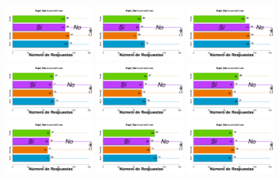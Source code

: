 \begin{figure}[th]
\includegraphics[width=0.30\textwidth]{Figures/BiasColor_Exp2_P10} \includegraphics[width=0.30\textwidth]{Figures/BiasColor_Exp2_P11} \includegraphics[width=0.30\textwidth]{Figures/BiasColor_Exp2_P12}
\includegraphics[width=0.30\textwidth]{Figures/BiasColor_Exp2_P13} \includegraphics[width=0.30\textwidth]{Figures/BiasColor_Exp2_P14} \includegraphics[width=0.30\textwidth]{Figures/BiasColor_Exp2_P15}
\includegraphics[width=0.30\textwidth]{Figures/BiasColor_Exp2_P16} \includegraphics[width=0.30\textwidth]{Figures/BiasColor_Exp2_P17} \includegraphics[width=0.30\textwidth]{Figures/BiasColor_Exp2_P18}

\end{figure}
